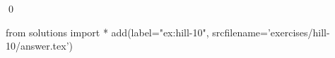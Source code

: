 
\begin{ex} 
  \label{ex:hill-10}
  
  \qed
\end{ex} 
\begin{python0}
from solutions import *
add(label="ex:hill-10",
    srcfilename='exercises/hill-10/answer.tex') 
\end{python0}
